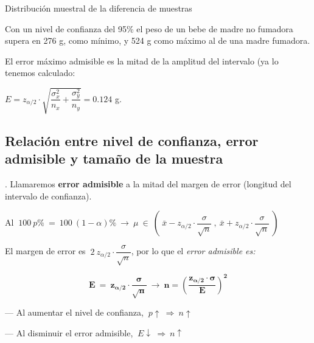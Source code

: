 \begin{myalertblock}{Distribución muestral de la diferencia de muestras}
\begin{ejemplo}
\begin{ejre}
\vspace{2mm} Con un nivel de confianza del 95\% el peso de un bebe de madre no fumadora supera en 276 g, como mínimo, y 524 g como máximo al de una madre fumadora.

\vspace{2mm} El error máximo admisible es la mitad de la amplitud del intervalo (ya lo tenemos calculado:

\vspace{2mm} $E=z_{\alpha/2} \cdot \sqrt{\dfrac {\sigma_x^2}{n_x} +\dfrac {\sigma_y^2}{n_y}} =0.124 $ g.
\end{ejre}
	
\end{ejemplo}

\end{myalertblock}



\vspace{1cm} %
\subsection{Relación entre nivel de confianza, error admisible y tamaño de la muestra}

\vspace{4mm} %
\begin{definition}
.	Llamaremos \textbf{error admisible} a la mitad del margen de error (longitud del intervalo de confianza).

\vspace{2mm} Al $\ 100\ p\% \ = \ 100\ (1-\alpha)\% \ \longrightarrow \ 
\mu \ \in \ \left( \ 
\bar x - z_{\alpha/2} \cdot \dfrac{\sigma}{\sqrt{n}} 
\ , \ 
\bar x + z_{\alpha/2} \cdot \dfrac{\sigma}{\sqrt{n}} \ \right) $

\vspace{2mm} El margen de error es $\ 2\  z_{\alpha/2} \cdot \dfrac{\sigma}{\sqrt{n}}$, por lo que el \emph{error admisible es:}

$$\boldsymbol{
E\ = \ z_{\alpha/2} \cdot \dfrac{\sigma}{\sqrt{n}} \ \longrightarrow \ 
n=\left( \dfrac{z_{\alpha/2} \cdot \sigma}{E} \right)^2
}$$

\vspace{2mm} --- Al aumentar el nivel de confianza, $\ p\uparrow \ \Rightarrow \  n \uparrow$

\vspace{2mm} --- Al disminuir el error admisible, $\ E \downarrow \ \Rightarrow  \ n \uparrow$

\end{definition}

